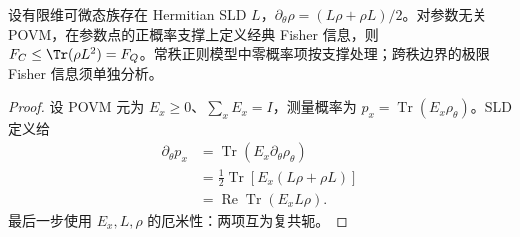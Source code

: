 \begin{theorem}
设有限维可微态族存在 Hermitian SLD $L$，$\partial_\theta\rho=(L\rho+\rho L)/2$。对参数无关 POVM，在参数点的正概率支撑上定义经典 Fisher 信息，则 $F_C\le\Tr(\rho L^2)=F_Q$。常秩正则模型中零概率项按支撑处理；跨秩边界的极限 Fisher 信息须单独分析。
\end{theorem}
\begin{proof}
设 POVM 元为 $E_x\ge0$、$\sum_xE_x=I$，测量概率为
$p_x=\operatorname{Tr}(E_x\rho_\theta)$。SLD 定义给
\begin{align*}
 \partial_\theta p_x
 &=\operatorname{Tr}(E_x\partial_\theta\rho_\theta)\\
 &=\frac12\operatorname{Tr}[E_x(L\rho+\rho L)]\\
 &=\operatorname{Re}\operatorname{Tr}(E_xL\rho).
\end{align*}
最后一步使用 $E_x,L,\rho$ 的厄米性：两项互为复共轭。


\end{proof}
